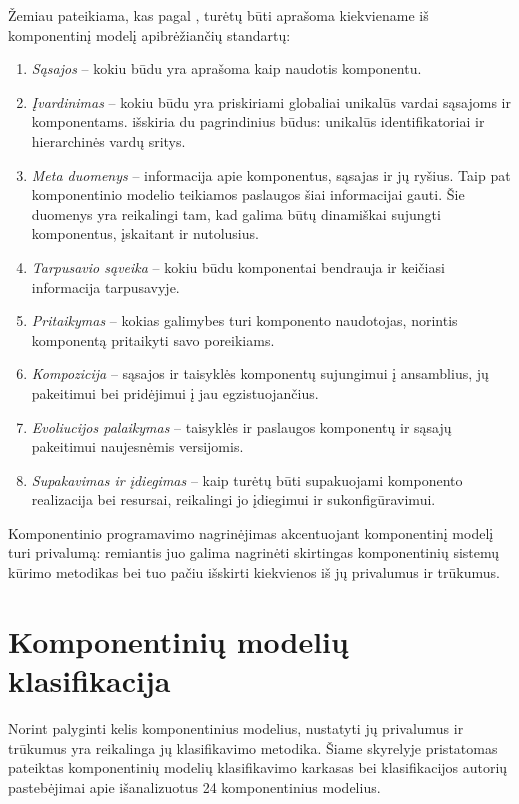 Žemiau pateikiama, kas pagal \cite[37]{heineman2001component}, turėtų
būti aprašoma kiekviename iš komponentinį modelį apibrėžiančių standartų:
\begin{enumerate}
  \item \emph{Sąsajos} – kokiu būdu yra aprašoma kaip naudotis
    komponentu.
  \item \emph{Įvardinimas} – kokiu būdu yra priskiriami globaliai
    unikalūs vardai sąsajoms ir komponentams.
    \cite[40]{heineman2001component} išskiria du pagrindinius būdus:
    unikalūs identifikatoriai ir hierarchinės vardų sritys.
  \item \emph{Meta duomenys} – informacija apie komponentus, sąsajas
    ir jų ryšius. Taip pat komponentinio modelio teikiamos paslaugos
    šiai informacijai gauti. Šie duomenys yra reikalingi tam, kad
    galima būtų dinamiškai sujungti komponentus, įskaitant ir
    nutolusius.
  \item \emph{Tarpusavio sąveika} – kokiu būdu komponentai bendrauja
    ir keičiasi informacija tarpusavyje.
  \item \emph{Pritaikymas} – kokias galimybes turi komponento naudotojas,
    norintis komponentą pritaikyti savo poreikiams.
  \item \emph{Kompozicija} – sąsajos ir taisyklės komponentų
    sujungimui į ansamblius, jų pakeitimui bei pridėjimui į jau
    egzistuojančius.
  \item \emph{Evoliucijos palaikymas} – taisyklės ir paslaugos
    komponentų ir sąsajų pakeitimui naujesnėmis versijomis.
  \item \emph{Supakavimas ir įdiegimas} – kaip turėtų būti supakuojami
    komponento realizacija bei resursai, reikalingi jo įdiegimui
    ir sukonfigūravimui.
\end{enumerate}

Komponentinio programavimo nagrinėjimas akcentuojant komponentinį modelį
turi privalumą: remiantis juo galima nagrinėti skirtingas
komponentinių sistemų kūrimo metodikas bei tuo pačiu išskirti
kiekvienos iš jų privalumus ir trūkumus.

\section{Komponentinių modelių klasifikacija}

\label{section:component:model:classification}

Norint palyginti kelis komponentinius modelius, nustatyti jų privalumus
ir trūkumus yra reikalinga jų klasifikavimo metodika. Šiame skyrelyje
pristatomas \cite{classification-framework-for-scm} pateiktas
komponentinių modelių klasifikavimo karkasas bei klasifikacijos
autorių pastebėjimai apie išanalizuotus 24 komponentinius modelius.

